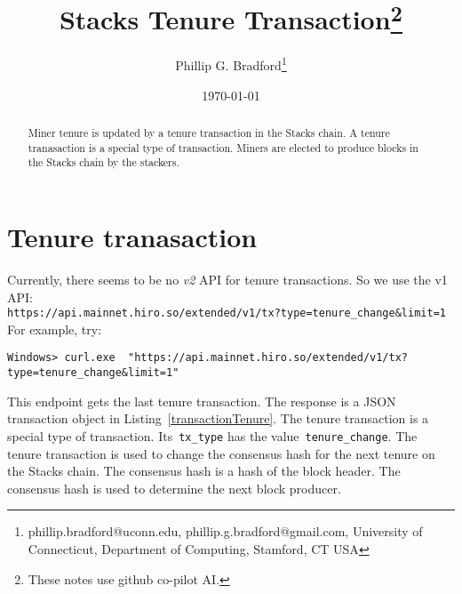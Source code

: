 \documentclass[12pt]{article}
\begin{document}
\title{Stacks Tenure Transaction\footnote{These notes use github co-pilot AI.}}
\author{
Phillip G. Bradford\thanks{phillip.bradford@uconn.edu, phillip.g.bradford@gmail.com,
{\sc University of Connecticut, Department of Computing, Stamford, CT USA}}
}

\date{\small\today}

\maketitle

%
%
%
\begin{abstract}
Miner tenure is updated by a tenure transaction in the Stacks chain.
A tenure tranasaction is a special type of transaction.
Miners are elected to produce blocks in the Stacks chain by the stackers.
\end{abstract}

%
%
%
%
\section{Tenure tranasaction}
\label{Tenure tranasaction}

Currently, there seems to be no {\em v2} API for tenure transactions.  
So we use the v1 API:\\

\lstinline|https://api.mainnet.hiro.so/extended/v1/tx?type=tenure_change&limit=1|\\


For example, try:\\
\begin{lstlisting}[label=tenure=curl,style=json, caption={Curl command for getting the current tenured transaction}]
  Windows> curl.exe  "https://api.mainnet.hiro.so/extended/v1/tx?type=tenure_change&limit=1"
 \end{lstlisting}

%
%
\vspace{0.25in}
%
%

This endpoint gets the last tenure transaction.  The response is a JSON transaction object in Listing~\ref{transactionTenure}.
The tenure transaction is a special type of transaction.  
Its~\lstinline|tx_type| has the value~\lstinline|tenure_change|.  
 The tenure transaction is used to change the consensus hash for the next tenure on the Stacks chain. 
 The consensus hash is a hash of the block header.  
The consensus hash is used to determine the next block producer. 

%
%
\vspace{0.25in}
%
%
\end{document}
